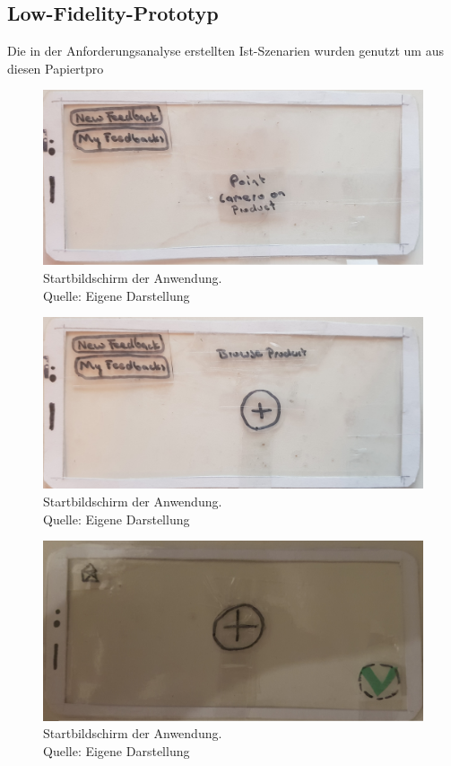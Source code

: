 \subsection{Low-Fidelity-Prototyp}

Die in der Anforderungsanalyse erstellten Ist-Szenarien wurden genutzt um aus diesen Papiertpro


\begin{figure}[H]
	\centering
	\includegraphics[width=.7\textwidth]{resources/conception/lowfi_startbildschirm.jpg}
	\caption{Startbildschirm der Anwendung. \\Quelle: Eigene Darstellung}
	\label{img:sysstem_sketch}
\end{figure}

\begin{figure}[H]
	\centering
	\includegraphics[width=.7\textwidth]{resources/conception/lowfi_browseOnProduct.jpg}
	\caption{Startbildschirm der Anwendung. \\Quelle: Eigene Darstellung}
	\label{img:sysstem_sketch}
\end{figure}

\begin{figure}[H]
	\centering
	\includegraphics[width=.7\textwidth]{resources/conception/lowfi_create.jpg}
	\caption{Startbildschirm der Anwendung. \\Quelle: Eigene Darstellung}
	\label{img:sysstem_sketch}
\end{figure}

